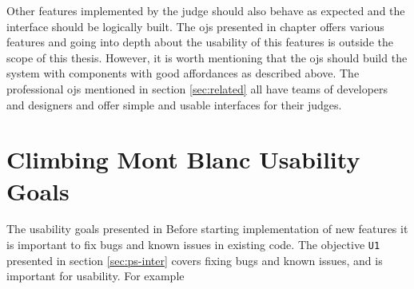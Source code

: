 Other features implemented by the judge should also behave as expected and the interface should be logically built. The \glspl{oj} presented in chapter offers various features and going into depth about the usability of this features is outside the scope of this thesis. However, it is worth mentioning that the \glspl{oj} should build the system with components with good affordances as described above. The professional \glspl{oj} mentioned in section \ref{sec:related} all have teams of developers and designers and offer simple and usable interfaces for their judges.

\section{Climbing Mont Blanc Usability Goals}
\label{sec:cmb-usability}
The usability goals presented in 
Before starting implementation of new features it is important to fix bugs and known issues in existing code. The objective   \texttt{U1} presented in section \ref{sec:ps-inter} covers fixing bugs and known issues, and is important for usability. For example
